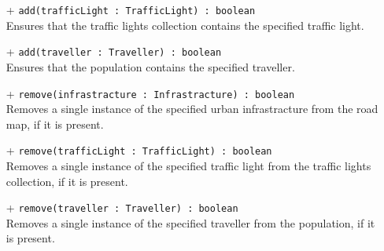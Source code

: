 \begin{itemize}
\begin{itemize}
    \item[+] \texttt{add(trafficLight : TrafficLight) : boolean} \\
    Ensures that the traffic lights collection contains the specified traffic light.
    \item[+] \texttt{add(traveller : Traveller) : boolean} \\
    Ensures that the population contains the specified traveller.
    \item[+] \texttt{remove(infrastracture : Infrastracture) : boolean} \\
    Removes a single instance of the specified urban infrastracture from the road map, if it is present.
    \item[+] \texttt{remove(trafficLight : TrafficLight) : boolean} \\
    Removes a single instance of the specified traffic light from the traffic lights collection, if it is present.
    \item[+] \texttt{remove(traveller : Traveller) : boolean} \\
    Removes a single instance of the specified traveller from the population, if it is present.
  \end{itemize}
\end{itemize} 
